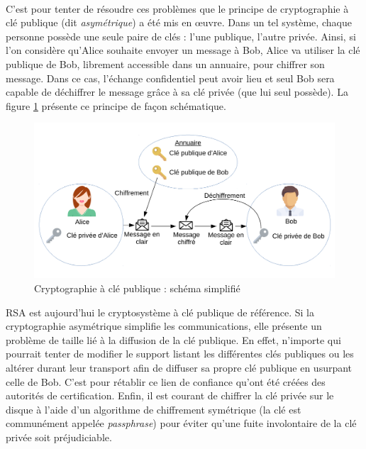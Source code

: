 \documentclass[a4paper,10pt]{article}
\begin{document}
\paragraph {} C'est pour tenter de résoudre ces problèmes que le principe de cryptographie à clé publique (dit \textit{asymétrique}) a été mis en œuvre. Dans un tel système, chaque personne possède une seule paire de clés : l'une publique, l'autre privée. Ainsi, si l'on considère qu'Alice souhaite envoyer un message à Bob, Alice va utiliser la clé publique de Bob, librement accessible dans un annuaire, pour chiffrer son message. Dans ce cas, l'échange confidentiel peut avoir lieu et seul Bob sera capable de déchiffrer le message grâce à sa clé privée (que lui seul possède). La figure \ref{crypto_pub} présente ce principe de façon schématique.

\begin{figure}[htp]
  \centering
  \includegraphics[width=15cm]{images/crypto_pub.pdf}
  \caption{Cryptographie à clé publique : schéma simplifié}
  \label{crypto_pub}
\end{figure}

RSA est aujourd'hui le cryptosystème à clé publique de référence. Si la cryptographie asymétrique simplifie les communications, elle présente un problème de taille lié à la diffusion de la clé publique. En effet, n'importe qui pourrait tenter de modifier le support listant les différentes clés publiques ou les altérer durant leur transport afin de diffuser sa propre clé publique en usurpant celle de Bob. C'est pour rétablir ce lien de confiance qu'ont été créées des autorités de certification. Enfin, il est courant de chiffrer la clé privée sur le disque à l'aide d'un algorithme de chiffrement symétrique (la clé est communément appelée \textit{passphrase}) pour éviter qu'une fuite involontaire de la clé privée soit préjudiciable.
\end{document}
